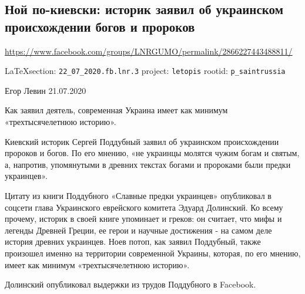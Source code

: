 
 
  
\subsection{Ной по-киевски: историк заявил об украинском происхождении богов и пророков}
\label{sec:22_07_2020.fb.lnr.3}
\url{https://www.facebook.com/groups/LNRGUMO/permalink/2866227443488811/}

\vspace{0.5cm}
{\small\LaTeX section: \verb|22_07_2020.fb.lnr.3| project: \verb|letopis| rootid: \verb|p_saintrussia|}
\vspace{0.5cm}


Егор Левин
21.07.2020

Как заявил деятель, современная Украина имеет как минимум «трехтысячелетнюю
историю».

Киевский историк Сергей Поддубный заявил об украинском происхождении пророков и
богов. По его мнению, «не украинцы молятся чужим богам и святым, а, напротив,
упомянутыми в древних текстах богами и пророками были предки украинцев».

Цитату из книги Поддубного «Славные предки украинцев» опубликовал в соцсети
глава Украинского еврейского комитета Эдуард Долинский. Ко всему прочему,
историк в своей книге упоминает и греков: он считает, что мифы и легенды
Древней Греции, ее герои и научные достижения - на самом деле история древних
украинцев.  Ноев потоп, как заявил Поддубный, также произошел именно на
территории современной Украины, которая, по его мнению, имеет как минимум
«трехтысячелетнюю историю».

Долинский опубликовал выдержки из трудов Поддубного в Facebook.
